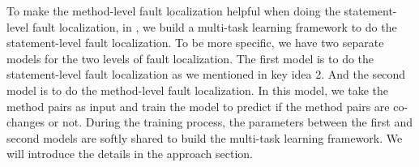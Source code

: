 To make the method-level fault localization helpful when doing the statement-level fault localization, in \tool, we build a multi-task learning framework to do the statement-level fault localization. To be more specific, we have two separate models for the two levels of fault localization. The first model is to do the statement-level fault localization as we mentioned in key idea 2. And the second model is to do the method-level fault localization. In this model, we take the method pairs as input and train the model to predict if the method pairs are co-changes or not. During the training process, the parameters between the first and second models are softly shared to build the multi-task learning framework. We will introduce the details in the approach section.



